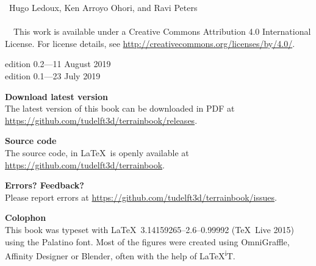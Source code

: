 
\clearpage
\thispagestyle{empty}
\null%
\vfill


\textcopyright\ Hugo Ledoux, Ken Arroyo Ohori, and Ravi Peters
\\ \\
\ccLogo\ \ccAttribution\ This work is available under a Creative Commons Attribution 4.0 International License.
For license details, see \url{http://creativecommons.org/licenses/by/4.0/}.


edition 0.2---11 August 2019
\\
edition 0.1---23 July 2019


\textbf{Download latest version} \\
The latest version of this book can be downloaded in PDF at \url{https://github.com/tudelft3d/terrainbook/releases}.


\textbf{Source code} \\
The source code, in \LaTeX\, is openly available at \url{https://github.com/tudelft3d/terrainbook}.


\textbf{Errors? Feedback?} \\
Please report errors at \url{https://github.com/tudelft3d/terrainbook/issues}.

\textbf{Colophon} \\
This book was typeset with \LaTeX\ 3.14159265--2.6--0.99992 (\TeX\ Live 2015) using the Palatino font.
Most of the figures were created using OmniGraffle, Affinity Designer or Blender, often with the help of \LaTeX{}\textsuperscript{i}T.

